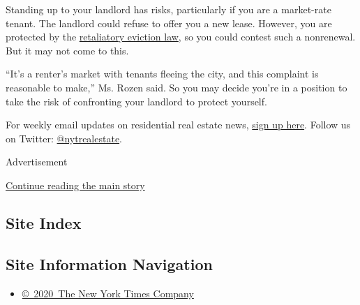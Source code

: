 Standing up to your landlord has risks, particularly if you are a
market-rate tenant. The landlord could refuse to offer you a new lease.
However, you are protected by the
\href{https://www1.nyc.gov/site/fairhousing/rights-responsibilities/retaliation.page}{retaliatory
eviction law}, so you could contest such a nonrenewal. But it may not
come to this.

``It's a renter's market with tenants fleeing the city, and this
complaint is reasonable to make,'' Ms. Rozen said. So you may decide
you're in a position to take the risk of confronting your landlord to
protect yourself.

For weekly email updates on residential real estate news,
\href{http://www.nytimes.com/newsletters/realestate/}{sign up here}.
Follow us on Twitter:
\href{https://twitter.com/nytrealestate}{@nytrealestate}.

Advertisement

\protect\hyperlink{after-bottom}{Continue reading the main story}

\hypertarget{site-index}{%
\subsection{Site Index}\label{site-index}}

\hypertarget{site-information-navigation}{%
\subsection{Site Information
Navigation}\label{site-information-navigation}}

\begin{itemize}
\tightlist
\item
  \href{https://help.nytimes.com/hc/en-us/articles/115014792127-Copyright-notice}{©~2020~The
  New York Times Company}
\end{itemize}

